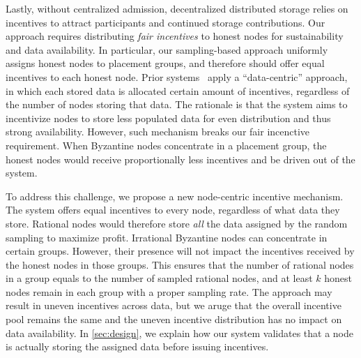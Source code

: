 Lastly, without centralized admission, decentralized distributed storage relies on incentives to attract participants and continued storage contributions.
Our approach requires distributing \emph{fair incentives} to honest nodes for sustainability and data availability.
In particular, our sampling-based approach uniformly assigns honest nodes to placement groups, and therefore should offer equal incentives to each honest node.
Prior systems~\cite{filecoin,sia,shelby,permacoin,retricoin,arweave,walrus,bft-dsn,swarm} apply a ``data-centric'' approach, in which each stored data is allocated certain amount of incentives, regardless of the number of nodes storing that data.
The rationale is that the system aims to incentivize nodes to store less populated data for even distribution and thus strong availability.
However, such mechanism breaks our fair incenctive requirement.
When Byzantine nodes concentrate in a placement group, the honest nodes would receive proportionally less incentives and be driven out of the system.

To address this challenge, we propose a new node-centric incentive mechanism.
The system offers equal incentives to every node, regardless of what data they store.
Rational nodes would therefore store \emph{all} the data assigned by the random sampling to maximize profit.
Irrational Byzantine nodes can concentrate in certain groups.
However, their presence will not impact the incentives received by the honest nodes in those groups.
This ensures that the number of rational nodes in a group equals to the number of sampled rational nodes, and at least $k$ honest nodes remain in each group with a proper sampling rate.
The approach may result in uneven incentives across data, but we aruge that the overall incentive pool remains the same and the uneven incentive distribution has no impact on data availability.
In \cref{sec:design}, we explain how our system validates that a node is actually storing the assigned data before issuing incentives.


